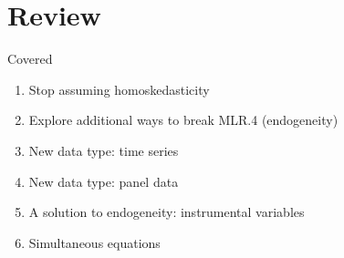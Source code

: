 \documentclass[aspectratio=169]{beamer}
\begin{document}
\section{Review}

\begin{frame}{Covered}
\begin{enumerate}
	\item Stop assuming homoskedasticity
	\item Explore additional ways to break MLR.4 (endogeneity)
	\item New data type: time series
	\item New data type: panel data
	\item A solution to endogeneity: instrumental variables
	\item Simultaneous equations
\end{enumerate}
\end{frame}
\end{document}
